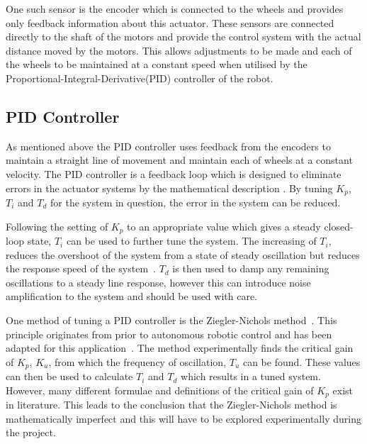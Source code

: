 One such sensor is the encoder which is connected to the wheels and provides only feedback information about this actuator. These sensors are connected directly to the shaft of the motors and provide the control system with the actual distance moved by the motors. This allows adjustments to be made and each of the wheels to be maintained at a constant speed when utilised by the Proportional-Integral-Derivative(PID) controller of the robot.  

\subsection{PID Controller}\label{litreview/robotics/pid}
As mentioned above the PID controller uses feedback from the encoders to maintain a straight line of movement and maintain each of wheels at a constant velocity. The PID controller is a feedback loop which is designed to eliminate errors in the actuator systems by the mathematical description . By tuning $ K_p $, $ T_i $ and $ T_d $ for the system in question, the error in the system can be reduced.    

Following the setting of $K_p$ to an appropriate value which gives a steady closed-loop state, $T_i$ can be used to further tune the system. The increasing of $T_i$, reduces the overshoot of the system from a state of steady oscillation but reduces the response speed of the system~\cite{chen2007linear}. $T_d$ is then used to damp any remaining oscillations to a steady line response, however this can introduce noise amplification to the system and should be used with care. 

One method of tuning a PID controller is the Ziegler-Nichols method~\cite{ziegler1942optimum}. This principle originates from prior to autonomous robotic control and has been adapted for this application~\cite{aastrom2004revisiting}. The method experimentally finds the critical gain of $K_p$, $K_u$, from which the frequency of oscillation, $T_u$ can be found. These values can then be used to calculate $T_i$ and $T_d$ which results in a tuned system. However, many different formulae and definitions of the critical gain of $K_p$ exist in literature. This leads to the conclusion that the Ziegler-Nichols method is mathematically imperfect and this will have to be explored experimentally during the project.     

